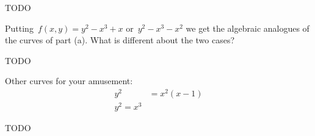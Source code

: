 \documentclass[a4paper,11pt,oneside,openany,article]{memoir}
\begin{document}
\begin{enumerate}
\begin{description}
      \begin{solution}
        TODO
      \end{solution}

      Putting~$f(x,y)=y^2-x^3+x$ or~$y^2-x^3-x^2$ we get the algebraic analogues of the curves of part (a). What is different about the two cases?

      \begin{solution}
        TODO
      \end{solution}

      Other curves for your amusement:
      \begin{align}
        y^2&=x^2(x-1) \\
        y^2=x^3
      \end{align}

      \begin{solution}
        TODO
      \end{solution}
  \end{description}
\end{enumerate}
\end{document}
